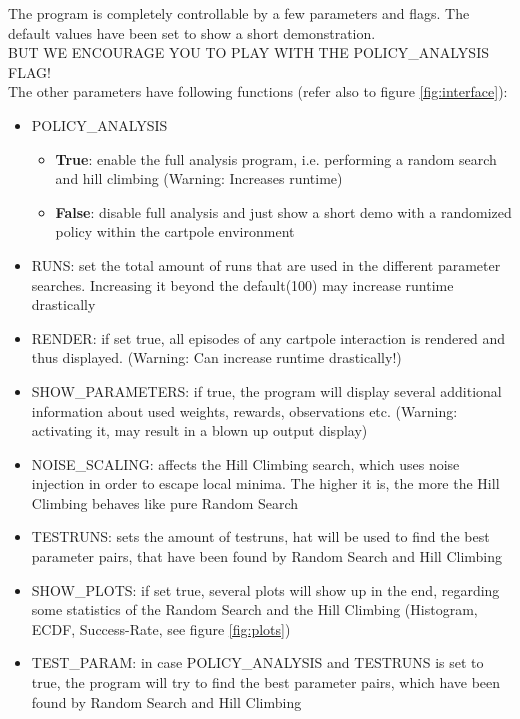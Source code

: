 \documentclass[a4paper, 11pt]{article}
\begin{document}
The program is completely controllable by a few parameters and flags. The default values have been set to show a short demonstration.\\
BUT WE ENCOURAGE YOU TO PLAY WITH THE POLICY\_ANALYSIS FLAG!\\
The other parameters have following functions (refer also to figure \ref{fig:interface}):
\begin{itemize}
	\item POLICY\_ANALYSIS
	\begin{itemize}
		\item \textbf{True}: enable the full analysis program, i.e. performing a random search and hill climbing (Warning: Increases runtime)
		\item \textbf{False}: disable full analysis and just show a short demo with a randomized policy within the cartpole environment
	\end{itemize}
	\item RUNS: set the total amount of runs that are used in the different parameter searches. Increasing it beyond the default(100) may increase runtime drastically
	\item RENDER: if set true, all episodes of any cartpole interaction is rendered and thus displayed. (Warning: Can increase runtime drastically!)
	\item SHOW\_PARAMETERS: if true, the program will display several additional information about used weights, rewards, observations etc. (Warning: activating it, may result in a blown up output display)
	\item NOISE\_SCALING: affects the Hill Climbing search, which uses noise injection in order to escape local minima. The higher it is, the more the Hill Climbing behaves like pure Random Search
	\item TESTRUNS: sets the amount of testruns, hat will be used to find the best parameter pairs, that have been found by Random Search and Hill Climbing
	\item SHOW\_PLOTS: if set true, several plots will show up in the end, regarding some statistics of the Random Search and the Hill Climbing (Histogram, ECDF, Success-Rate, see figure \ref{fig:plots})
	\item TEST\_PARAM: in case POLICY\_ANALYSIS and TESTRUNS is set to true, the program will try to find the best parameter pairs, which have been found by Random Search and Hill Climbing
\end{itemize}
\end{document}
